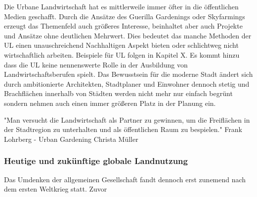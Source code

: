 \documentclass{article}
\begin{document}
Die Urbane Landwirtschaft hat es mittlerweile immer öfter in die öffentlichen Medien geschafft. Durch die Ansätze des Guerilla Gardenings oder Skyfarmings erzeugt das Themenfeld auch größeres Interesse, beinhaltet aber auch Projekte und Ansätze ohne deutlichen Mehrwert. Dies bedeutet das manche Methoden der UL einen unauschreichend Nachhaltigen Aspekt bieten oder schlichtweg nicht wirtschaftlich arbeiten. Beispiele für UL folgen in Kapitel X. Es kommt hinzu dass die UL keine nennenswerte Rolle in der Ausbildung von Landwirtschaftsberufen spielt. Das Bewusstsein für die moderne Stadt ändert sich durch ambitionierte Architekten, Stadtplaner und Einwohner dennoch stetig und Brachflächen innerhalb von Städten werden nicht mehr nur einfach begrünt sondern nehmen auch einen immer größeren Platz in der Planung ein. 

"Man versucht die Landwirtschaft als Partner zu gewinnen, um die Freiflächen in der Stadtregion zu unterhalten und als öffentlichen Raum zu bespielen." Frank Lohrberg - Urban Gardening Christa Müller

\subsubsection{Heutige und zukünftige globale Landnutzung}


Das Umdenken der allgemeinen Gesellschaft fandt dennoch erst zunemend nach dem ersten Weltkrieg statt. Zuvor 



\newpage
\listoffigures
\printbibliography
\end{document}
